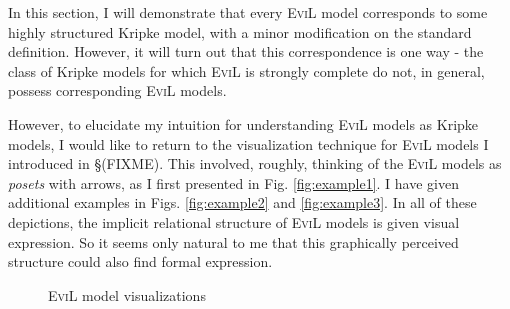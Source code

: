 In this section, I will demonstrate that every \textsc{EviL} model
corresponds to some highly structured Kripke model, with a minor
modification on the standard definition.  However, it will turn out
that this correspondence is one way - the class of Kripke models for
which \textsc{EviL} is strongly complete do not, in general,
possess corresponding \textsc{EviL} models.

However, to elucidate my intuition for understanding \textsc{EviL} models as
Kripke models, I would like to return to the visualization technique for
\textsc{EviL} models I introduced in \S(FIXME).  This involved, roughly,
thinking of the \textsc{EviL} models as \emph{posets} with arrows,
as I first presented in Fig. \ref{fig:example1}.  I have given
additional examples in Figs. \ref{fig:example2} and
\ref{fig:example3}.  
In all of these depictions, the implicit relational structure of \textsc{EviL} models is given
visual expression.  So it seems only natural to me that this graphically perceived structure
could also find formal expression.
\begin{figure}[ht]
\centering
{}
\caption{\textsc{EviL} model visualizations}
\end{figure}


